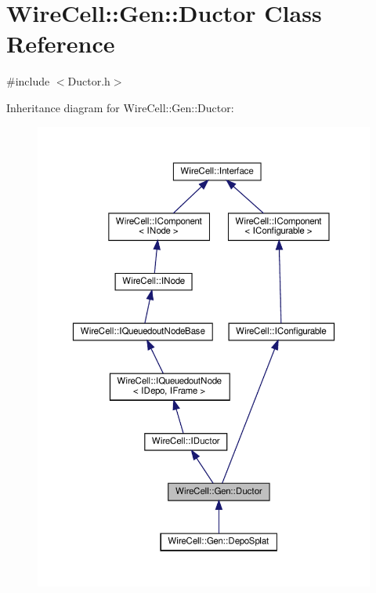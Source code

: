 \hypertarget{class_wire_cell_1_1_gen_1_1_ductor}{}\section{Wire\+Cell\+:\+:Gen\+:\+:Ductor Class Reference}
\label{class_wire_cell_1_1_gen_1_1_ductor}


{\ttfamily \#include $<$Ductor.\+h$>$}



Inheritance diagram for Wire\+Cell\+:\+:Gen\+:\+:Ductor\+:
\nopagebreak
\begin{figure}[H]
\begin{center}
\leavevmode
\includegraphics[width=350pt]{class_wire_cell_1_1_gen_1_1_ductor__inherit__graph}
\end{center}
\end{figure}



